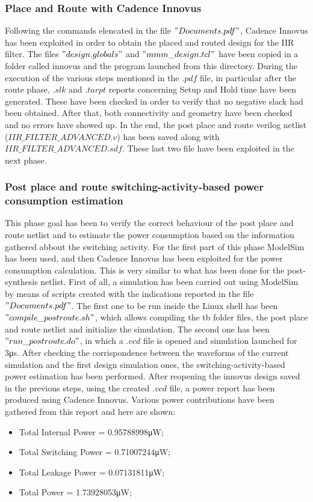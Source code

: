 \subsubsection{Place and Route with Cadence Innovus}
Following the commands elencated in the file $"Documents.pdf"$, Cadence Innovus has been exploited in order to obtain the placed and routed design for the IIR filter. The files $"design.globals"$ and $"mmm\_design.tcl"$ have been copied in a folder called innovus and the program launched from this directory.
During the execution of the various steps mentioned in the $.pdf$ file, in particular after the route phase, $.slk$ and $.tarpt$ reports concerning Setup and Hold time have been generated. These have been checked in order to verify that no negative slack had been obtained. After that, both connectivity and geometry have been checked and no errors have showed up. In the end, the post place and route verilog netlist ($IIR\_FILTER\_ADVANCED.v$) has been saved along with $IIR\_FILTER\_ADVANCED.sdf$. These last two file have been exploited in the next phase.
\subsubsection{Post place and route switching-activity-based power consumption estimation}
This phase goal has been to verify the correct behaviour of the post place and route netlist and to estimate the power consumption based on the information gathered abbout the switching activity. For the first part of this phase ModelSim has been used, and then Cadence Innovus has been exploited for the power consumption calculation. This is very similar to what has been done for the post-synthesis netlist.
\newline
\newline
First of all, a simulation has been carried out using ModelSim by means of scripts created with the indications reported in the file $"Documents.pdf"$. The first one to be run inside the Linux shell has been $"compile\_postroute.sh"$, which allows compiling the tb folder files, the post place and route netlist and initialize the simulation. The second one has been $"run\_postroute.do"$, in which a $.vcd$ file is opened and simulation launched for 3\si{\micro\second}.
\newline
\newline
After checking the corrispondence between the waveforms of the current simulation and the first design simulation ones, the switching-activity-based power estimation has been performed.
After reopening the innovus design saved in the previous steps, using the created $.vcd$ file, a power report has been produced using Cadence Innovus.
\newline
\newline
Various power contributions have been gathered from this report and here are shown:

\begin{itemize}
\item Total Internal Power = 0.95788998\si{\micro\watt};
\item Total Switching Power = 0.71007244\si{\micro\watt};
\item Total Leakage Power = 0.07131811\si{\micro\watt};
\item Total Power = 1.73928053\si{\micro\watt};
\end{itemize}